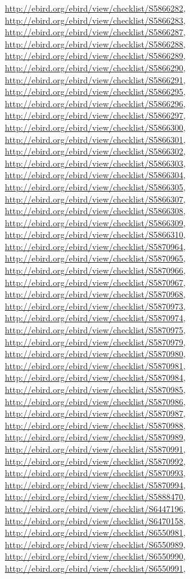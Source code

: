 \documentclass[9pt, article]{memoir}
\begin{document}
\begin{multicols}{2}
\url{http://ebird.org/ebird/view/checklist/S5866282}, 
\url{http://ebird.org/ebird/view/checklist/S5866283}, 
\url{http://ebird.org/ebird/view/checklist/S5866287}, 
\url{http://ebird.org/ebird/view/checklist/S5866288}, 
\url{http://ebird.org/ebird/view/checklist/S5866289}, 
\url{http://ebird.org/ebird/view/checklist/S5866290}, 
\url{http://ebird.org/ebird/view/checklist/S5866291}, 
\url{http://ebird.org/ebird/view/checklist/S5866295}, 
\url{http://ebird.org/ebird/view/checklist/S5866296}, 
\url{http://ebird.org/ebird/view/checklist/S5866297}, 
\url{http://ebird.org/ebird/view/checklist/S5866300}, 
\url{http://ebird.org/ebird/view/checklist/S5866301}, 
\url{http://ebird.org/ebird/view/checklist/S5866302}, 
\url{http://ebird.org/ebird/view/checklist/S5866303}, 
\url{http://ebird.org/ebird/view/checklist/S5866304}, 
\url{http://ebird.org/ebird/view/checklist/S5866305}, 
\url{http://ebird.org/ebird/view/checklist/S5866307}, 
\url{http://ebird.org/ebird/view/checklist/S5866308}, 
\url{http://ebird.org/ebird/view/checklist/S5866309}, 
\url{http://ebird.org/ebird/view/checklist/S5866310}, 
\url{http://ebird.org/ebird/view/checklist/S5870964}, 
\url{http://ebird.org/ebird/view/checklist/S5870965}, 
\url{http://ebird.org/ebird/view/checklist/S5870966}, 
\url{http://ebird.org/ebird/view/checklist/S5870967}, 
\url{http://ebird.org/ebird/view/checklist/S5870968}, 
\url{http://ebird.org/ebird/view/checklist/S5870973}, 
\url{http://ebird.org/ebird/view/checklist/S5870974}, 
\url{http://ebird.org/ebird/view/checklist/S5870975}, 
\url{http://ebird.org/ebird/view/checklist/S5870979}, 
\url{http://ebird.org/ebird/view/checklist/S5870980}, 
\url{http://ebird.org/ebird/view/checklist/S5870981}, 
\url{http://ebird.org/ebird/view/checklist/S5870984}, 
\url{http://ebird.org/ebird/view/checklist/S5870985}, 
\url{http://ebird.org/ebird/view/checklist/S5870986}, 
\url{http://ebird.org/ebird/view/checklist/S5870987}, 
\url{http://ebird.org/ebird/view/checklist/S5870988}, 
\url{http://ebird.org/ebird/view/checklist/S5870989}, 
\url{http://ebird.org/ebird/view/checklist/S5870991}, 
\url{http://ebird.org/ebird/view/checklist/S5870992}, 
\url{http://ebird.org/ebird/view/checklist/S5870993}, 
\url{http://ebird.org/ebird/view/checklist/S5870994}, 
\url{http://ebird.org/ebird/view/checklist/S5888470}, 
\url{http://ebird.org/ebird/view/checklist/S6447196}, 
\url{http://ebird.org/ebird/view/checklist/S6470158}, 
\url{http://ebird.org/ebird/view/checklist/S6550981}, 
\url{http://ebird.org/ebird/view/checklist/S6550989}, 
\url{http://ebird.org/ebird/view/checklist/S6550990}, 
\url{http://ebird.org/ebird/view/checklist/S6550991}, 

\end{multicols}
\end{document}
